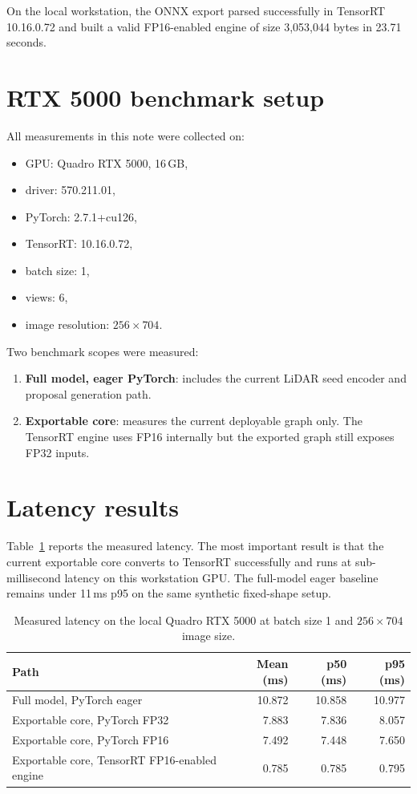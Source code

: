 \documentclass[11pt]{article}
\begin{document}
On the local workstation, the ONNX export parsed successfully in TensorRT 10.16.0.72 and built a valid FP16-enabled engine of size 3,053,044 bytes in 23.71 seconds.

\section{RTX 5000 benchmark setup}
All measurements in this note were collected on:
\begin{itemize}
\item GPU: Quadro RTX 5000, 16\,GB,
\item driver: 570.211.01,
\item PyTorch: 2.7.1+cu126,
\item TensorRT: 10.16.0.72,
\item batch size: 1,
\item views: 6,
\item image resolution: $256 \times 704$.
\end{itemize}

Two benchmark scopes were measured:
\begin{enumerate}
\item \textbf{Full model, eager PyTorch}: includes the current LiDAR seed encoder and proposal generation path.
\item \textbf{Exportable core}: measures the current deployable graph only. The TensorRT engine uses FP16 internally but the exported graph still exposes FP32 inputs.
\end{enumerate}

\section{Latency results}
Table~\ref{tab:latency} reports the measured latency. The most important result is that the current exportable core converts to TensorRT successfully and runs at sub-millisecond latency on this workstation GPU. The full-model eager baseline remains under 11\,ms p95 on the same synthetic fixed-shape setup.

\begin{table}[t]
\centering
\caption{Measured latency on the local Quadro RTX 5000 at batch size 1 and $256 \times 704$ image size.}
\label{tab:latency}
\begin{tabular}{lrrr}
\toprule
Path & Mean (ms) & p50 (ms) & p95 (ms) \\
\midrule
Full model, PyTorch eager & 10.872 & 10.858 & 10.977 \\
Exportable core, PyTorch FP32 & 7.883 & 7.836 & 8.057 \\
Exportable core, PyTorch FP16 & 7.492 & 7.448 & 7.650 \\
Exportable core, TensorRT FP16-enabled engine & 0.785 & 0.785 & 0.795 \\
\bottomrule
\end{tabular}
\end{table}
\end{document}
